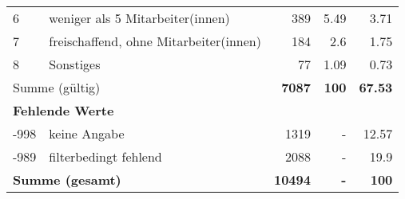 \begin{longtable}{lXrrr}
     6 &
     \multicolumn{1}{X}{ weniger als 5 Mitarbeiter(innen)   } &


       \num{389} &
       \num[round-mode=places,round-precision=2]{5,49} &
         \num[round-mode=places,round-precision=2]{3,71} \\

     7 &
     \multicolumn{1}{X}{ freischaffend, ohne Mitarbeiter(innen)   } &


       \num{184} &
       \num[round-mode=places,round-precision=2]{2,6} &
         \num[round-mode=places,round-precision=2]{1,75} \\

     8 &
     \multicolumn{1}{X}{ Sonstiges   } &


       \num{77} &
       \num[round-mode=places,round-precision=2]{1,09} &
         \num[round-mode=places,round-precision=2]{0,73} \\
     \midrule
     \multicolumn{2}{l}{Summe (gültig)} &
       \textbf{\num{7087}} &
     \textbf{100} &
       \textbf{\num[round-mode=places,round-precision=2]{67,53}} \\
     \multicolumn{5}{l}{\textbf{Fehlende Werte}}\\
       -998 &
       keine Angabe &
         \num{1319} &
        - &
         \num[round-mode=places,round-precision=2]{12,57} \\
       -989 &
       filterbedingt fehlend &
         \num{2088} &
        - &
         \num[round-mode=places,round-precision=2]{19,9} \\
     \midrule
     \multicolumn{2}{l}{\textbf{Summe (gesamt)}} &
          \textbf{\num{10494}} &
        \textbf{-} &
        \textbf{100} \\
     \bottomrule
     \end{longtable}
     
